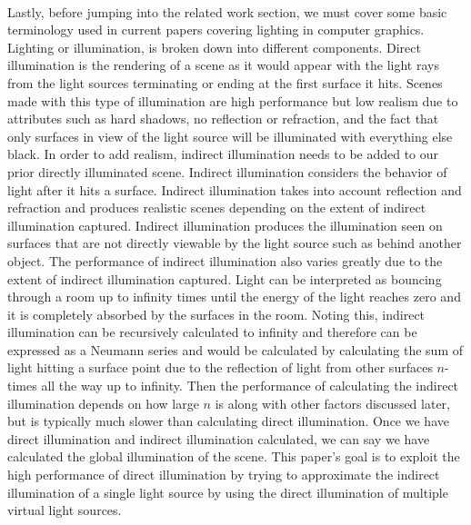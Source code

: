 \paragraph{}
Lastly, before jumping into the related work section, we must cover some basic terminology used in current papers covering lighting in computer graphics.  Lighting or illumination, is broken down into different components.  Direct illumination is the rendering of a scene as it would appear with the light rays from the light sources terminating or ending at the first surface it hits.  Scenes made with this type of illumination are high performance but low realism due to attributes such as hard shadows, no reflection or refraction, and the fact that only surfaces in view of the light source will be illuminated with everything else black.  In order to add realism, indirect illumination needs to be added to our prior directly illuminated scene.  Indirect illumination considers the behavior of light after it hits a surface.  Indirect illumination takes into account reflection and refraction and produces realistic scenes depending on the extent of indirect illumination captured.  Indirect illumination produces the illumination seen on surfaces that are not directly viewable by the light source such as behind another object.  The performance of indirect illumination also varies greatly due to the extent of indirect illumination captured.  Light can be interpreted as bouncing through a room up to infinity times until the energy of the light reaches zero and it is completely absorbed by the surfaces in the room.  Noting this, indirect illumination can be recursively calculated to infinity and therefore can be expressed as a Neumann series and would be calculated by calculating the sum of light hitting a surface point due to the reflection of light from other surfaces $n$-times all the way up to infinity.  Then the performance of calculating the indirect illumination depends on how large $n$ is along with other factors discussed later, but is typically much slower than calculating direct illumination.  Once we have direct illumination and indirect illumination calculated, we can say we have calculated the global illumination of the scene.  This paper's goal is to exploit the high performance of direct illumination by trying to approximate the indirect illumination of a single light source by using the direct illumination of multiple virtual light sources.
